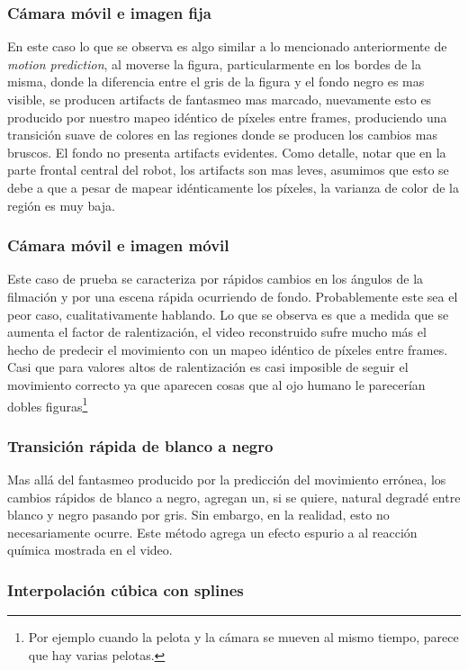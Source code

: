\subsubsection*{Cámara móvil e imagen fija}
En este caso lo que se observa es algo similar a lo mencionado anteriormente de \emph{motion prediction}, al moverse la figura, particularmente en los bordes de la misma, donde la diferencia entre el gris de la figura y el fondo negro es mas visible, se producen artifacts de fantasmeo mas marcado, nuevamente esto es producido por nuestro mapeo idéntico de píxeles entre frames, produciendo una transición suave de colores en las regiones donde se producen los cambios mas bruscos. El fondo no presenta artifacts evidentes. Como detalle, notar que en la parte frontal central del robot, los artifacts son mas leves, asumimos que esto se debe a que a pesar de mapear idénticamente los píxeles, la varianza de color de la región es muy baja.

\subsubsection*{Cámara móvil e imagen móvil}
Este caso de prueba se caracteriza por rápidos cambios en los ángulos de la filmación y por una escena rápida ocurriendo de fondo. Probablemente este sea el peor caso, cualitativamente hablando. Lo que se observa es que a medida que se aumenta el factor de ralentización, el video reconstruido sufre mucho más el hecho de predecir el movimiento con un mapeo idéntico de píxeles entre frames. Casi que para valores altos de ralentización es casi imposible de seguir el movimiento correcto ya que aparecen cosas que al ojo humano le parecerían dobles figuras\footnote{Por ejemplo cuando la pelota y la cámara se mueven al mismo tiempo, parece que hay varias pelotas.}

\subsubsection*{Transición rápida de blanco a negro}
Mas allá del fantasmeo producido por la predicción del movimiento errónea, los cambios rápidos de blanco a negro, agregan un, si se quiere, natural degradé entre blanco y negro pasando por gris. Sin embargo, en la realidad, esto no necesariamente ocurre. Este método agrega un efecto espurio a al reacción química mostrada en el video.


\subsubsection{\bf{Interpolación cúbica con splines}}
